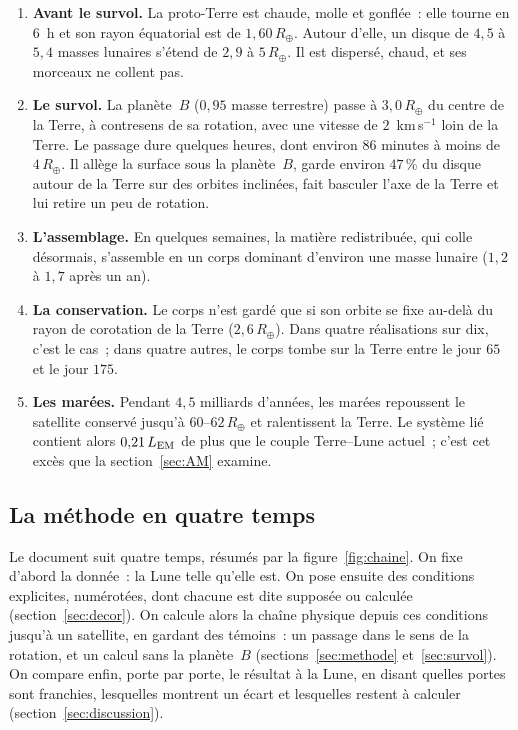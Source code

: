\documentclass[11pt,a4paper]{article}
\newcommand{\Rt}{\ensuremath{R_\oplus}}
\newcommand{\LEM}{\ensuremath{L_{\rm EM}}}
\begin{document}
\begin{enumerate}[leftmargin=1.6em,itemsep=3pt]
\item \textbf{Avant le survol.} La proto-Terre est chaude, molle et gonflée~: elle tourne en $6$~h et son rayon équatorial est de $1{,}60\,\Rt$. Autour d'elle, un disque de $4{,}5$ à $5{,}4$ masses lunaires s'étend de $2{,}9$ à $5\,\Rt$. Il est dispersé, chaud, et ses morceaux ne collent pas.
\item \textbf{Le survol.} La planète~$B$ ($0{,}95$ masse terrestre) passe à $3{,}0\,\Rt$ du centre de la Terre, à contresens de sa rotation, avec une vitesse de $2$~km\,s$^{-1}$ loin de la Terre. Le passage dure quelques heures, dont environ $86$ minutes à moins de $4\,\Rt$. Il allège la surface sous la planète~$B$, garde environ $47\,\%$ du disque autour de la Terre sur des orbites inclinées, fait basculer l'axe de la Terre et lui retire un peu de rotation.
\item \textbf{L'assemblage.} En quelques semaines, la matière redistribuée, qui colle désormais, s'assemble en un corps dominant d'environ une masse lunaire ($1{,}2$ à $1{,}7$ après un an).
\item \textbf{La conservation.} Le corps n'est gardé que si son orbite se fixe au-delà du rayon de corotation de la Terre ($2{,}6\,\Rt$). Dans quatre réalisations sur dix, c'est le cas~; dans quatre autres, le corps tombe sur la Terre entre le jour $65$ et le jour $175$.
\item \textbf{Les marées.} Pendant $4{,}5$ milliards d'années, les marées repoussent le satellite conservé jusqu'à $60$--$62\,\Rt$ et ralentissent la Terre. Le système lié contient alors $0{,}21\,\LEM$ de plus que le couple Terre--Lune actuel~; c'est cet excès que la section~\ref{sec:AM} examine.
\end{enumerate}

\subsection{La méthode en quatre temps}

Le document suit quatre temps, résumés par la figure~\ref{fig:chaine}. On fixe d'abord la donnée~: la Lune telle qu'elle est. On pose ensuite des conditions explicites, numérotées, dont chacune est dite supposée ou calculée (section~\ref{sec:decor}). On calcule alors la chaîne physique depuis ces conditions jusqu'à un satellite, en gardant des témoins~: un passage dans le sens de la rotation, et un calcul sans la planète~$B$ (sections~\ref{sec:methode} et~\ref{sec:survol}). On compare enfin, porte par porte, le résultat à la Lune, en disant quelles portes sont franchies, lesquelles montrent un écart et lesquelles restent à calculer (section~\ref{sec:discussion}).
\end{document}
